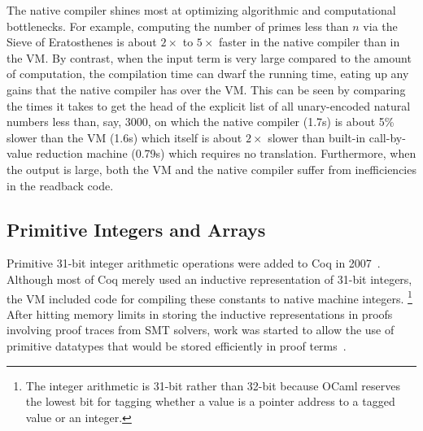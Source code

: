 The native compiler shines most at optimizing algorithmic and computational bottlenecks.
For example, computing the number of primes less than $n$ via the Sieve of Eratosthenes is about $2\times$ to $5\times$ faster in the native compiler than in the VM.
By contrast, when the input term is very large compared to the amount of computation, the compilation time can dwarf the running time, eating up any gains that the native compiler has over the VM.
This can be seen by comparing the times it takes to get the head of the explicit list of all unary-encoded natural numbers less than, say, 3000, on which the native compiler (1.7s) is about 5\% slower than the VM (1.6s) which itself is about $2\times$ slower than built-in call-by-value reduction machine (0.79s) which requires no translation.
Furthermore, when the output is large, both the VM and the native compiler suffer from inefficiencies in the readback code.



\subsection{Primitive Integers and Arrays}\label{sec:prim-ints-arrays}
Primitive 31-bit integer arithmetic operations were added to Coq in 2007~\cite{coq-commit-int31,Extending2010Armand}.
Although most of Coq merely used an inductive representation of 31-bit integers, the VM included code for compiling these constants to native machine integers.%
\footnote{%
  The integer arithmetic is 31-bit rather than 32-bit because OCaml reserves the lowest bit for tagging whether a value is a pointer address to a tagged value or an integer.%
}
After hitting memory limits in storing the inductive representations in proofs involving proof traces from SMT solvers, work was started to allow the use of primitive datatypes that would be stored efficiently in proof terms~\cite{denes2013prim-ints-arrays}.

